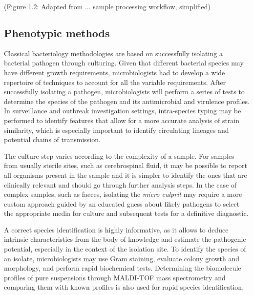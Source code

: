 (Figure 1.2: Adapted from ... sample processing workflow, simplified)

\subsection{Phenotypic methods}

Classical bacteriology methodologies are based on successfully isolating a bacterial pathogen through culturing. Given that different bacterial species may have different growth requirements, microbiologists had to develop a wide repertoire of techniques to account for all the variable requirements. After successfully isolating a pathogen, microbiologists will perform a series of tests to determine the species of the pathogen and its antimicrobial and virulence profiles. In surveillance and outbreak investigation settings, intra-species typing may be performed to identify features that allow for a more accurate analysis of strain similarity, which is especially important to identify circulating lineages and potential chains of transmission.

The culture step varies according to the complexity of a sample. For samples from usually sterile sites, such as cerebrospinal fluid, it may be possible to report all organisms present in the sample and it is simpler to identify the ones that are clinically relevant and should go through further analysis steps. In the case of complex samples, such as faeces, isolating the \textit{micro culprit} may require a more custom approach guided by an educated guess about likely pathogens to select the appropriate media for culture and subsequent tests for a definitive diagnostic.

A correct species identification is highly informative, as it allows to deduce intrinsic characteristics from the body of knowledge and estimate the pathogenic potential, especially in the context of the isolation site. To identify the species of an isolate, microbiologists may use Gram staining, evaluate colony growth and morphology, and perform rapid biochemical tests. Determining the biomolecule profiles of pure suspensions through \ac{MALDI-TOF} mass spectrometry and comparing them with known profiles is also used for rapid species identification.

